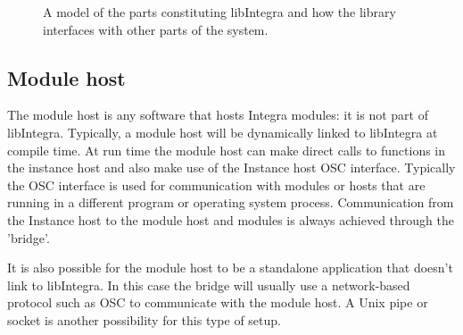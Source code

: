 \documentclass{article}
\begin{document}
\begin{figure}
\centerline{}
\caption{A model of the parts constituting libIntegra and how the library interfaces with other parts of the system.}
\label{fig:model}
\end{figure}

\subsection{Module host}\label{subsec:module_host}

The module host is any software that hosts Integra modules: it is not part of libIntegra. Typically, a module host will be dynamically linked to libIntegra at compile time. At run time the module host can make direct calls to functions in the instance host and also make use of the Instance host OSC interface. Typically the OSC interface is used for communication with modules or hosts that are running in a different program or operating system process. Communication from the Instance host to the module host and modules is always achieved through the 'bridge'.

It is also possible for the module host to be a standalone application that doesn't link to libIntegra. In this case the bridge will usually use a network-based protocol such as OSC to communicate with the module host. A Unix pipe or socket is another possibility for this type of setup.
\end{document}
